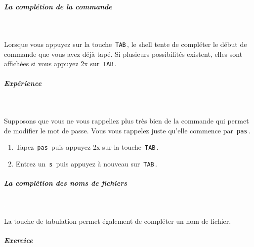 \documentclass[11pt,a4paper]{article}
\begin{document}
            \par
        
			
		\subparagraph{La compl\'etion de la commande} 
		
					\textcolor{white}{.} \par
				
            \par
        
          Lorsque vous appuyez sur la touche \,\verb|TAB|\,,
          le shell tente de compl\'eter le d\'ebut de commande que vous avez d\'ej\`a tap\'e.
          Si plusieurs possibilit\'es existent, elles sont affich\'ees si vous appuyez 2x sur  \,\verb|TAB|\,.  
        
            \par
        
			
		\subparagraph{Exp\'erience} 
		
					\textcolor{white}{.} \par
				
            \par
          
          Supposons que vous ne vous rappeliez plus tr\`es bien de la commande qui permet de modifier le mot de passe.
          Vous vous rappelez juste qu'elle commence par \,\verb|pas|\,.  
        
            \par
        
					\begin{enumerate}
				
			\item 
			  Tapez \,\verb|pas|\,  
			  puis appuyez 2x sur la touche \,\verb|TAB|\,.
			\item 
			Entrez un \,\verb|s|\,  
            puis appuyez \`a nouveau sur \,\verb|TAB|\,.
          
					\end{enumerate}
				
			
		\subparagraph{La compl\'etion des noms de fichiers} 
		
					\textcolor{white}{.} \par
				
            \par
        
          La touche de tabulation permet \'egalement de compl\'eter un nom de fichier. 
        
            \par
        
			
		\subparagraph{Exercice} 
		
\end{document}

